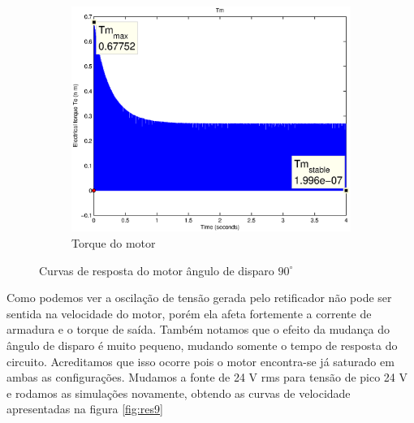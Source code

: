 \documentclass{article}
\begin{document}
\begin{figure}[H]
\begin{subfigure}[b]{0.49\linewidth}
		\includegraphics[width=\linewidth]{matlab/tm5}
		\caption{Torque do motor}
	\end{subfigure}
	\caption{Curvas de resposta do motor ângulo de disparo $90^\circ$}
	\label{fig:res5}
\end{figure}
Como podemos ver a oscilação de tensão gerada pelo retificador não pode ser sentida na velocidade do motor, porém ela afeta fortemente a corrente de armadura e o torque de saída. Também notamos que o efeito da mudança do ângulo de disparo é muito pequeno, mudando somente o tempo de resposta do circuito. Acreditamos que isso ocorre pois o motor encontra-se já saturado em ambas as configurações. Mudamos a fonte de 24 V rms para tensão de pico 24 V e rodamos as simulações novamente, obtendo as curvas de velocidade apresentadas na figura \ref{fig:res9}
\end{document}
